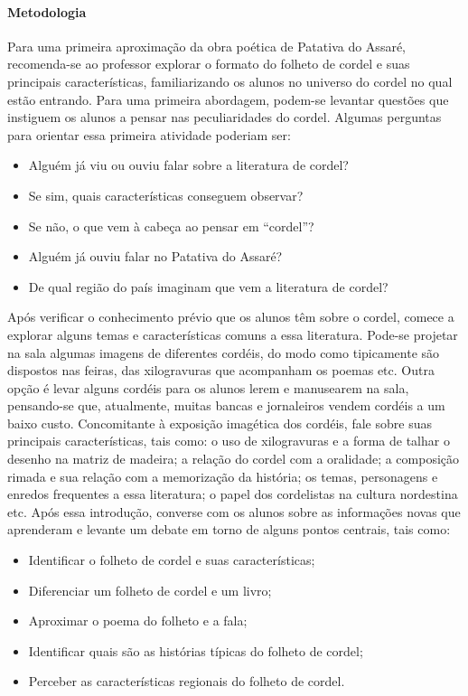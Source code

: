 \documentclass[11pt]{extarticle}
\begin{document}
\paragraph{Metodologia} Para uma primeira aproximação da obra poética de Patativa do Assaré, recomenda-se ao professor explorar o formato do folheto de cordel e suas principais características, familiarizando os alunos no universo do cordel no qual estão entrando. 
Para uma primeira abordagem, podem-se levantar questões que instiguem os alunos a pensar nas peculiaridades do cordel.
Algumas perguntas para orientar essa primeira atividade poderiam ser:

\begin{itemize}
\item Alguém já viu ou ouviu falar sobre a literatura de cordel?

\item Se sim, quais características conseguem observar?

\item Se não, o que vem à cabeça ao pensar em ``cordel''?

\item Alguém já ouviu falar no Patativa do Assaré?

\item De qual região do país imaginam que vem a literatura de cordel?
\end{itemize}


Após verificar o conhecimento prévio que os alunos têm sobre o cordel, comece a explorar alguns temas e características comuns a essa literatura. Pode-se projetar na sala algumas imagens de diferentes cordéis, do modo como tipicamente são dispostos nas feiras, das xilogravuras que acompanham os poemas etc. Outra opção é levar alguns cordéis para os alunos lerem e manusearem na sala, pensando-se que, atualmente, muitas bancas e jornaleiros vendem cordéis a um baixo custo.
Concomitante à exposição imagética dos cordéis, fale sobre suas principais características, tais como: o uso de xilogravuras e a forma de talhar o desenho na matriz de madeira; a relação do cordel com a oralidade; a composição rimada e sua relação com a memorização da história; os temas, personagens e enredos frequentes a essa literatura; o papel dos cordelistas na cultura nordestina etc.
Após essa introdução, converse com os alunos sobre as informações novas que aprenderam e levante um debate em torno de alguns pontos centrais, tais como:

\begin{itemize}
\item Identificar o folheto de cordel e suas características;

\item Diferenciar um folheto de cordel e um livro;

\item Aproximar o poema do folheto e a fala;

\item Identificar quais são as histórias típicas do folheto de cordel;

\item Perceber as características regionais do folheto de cordel.
\end{itemize}
\end{document}
